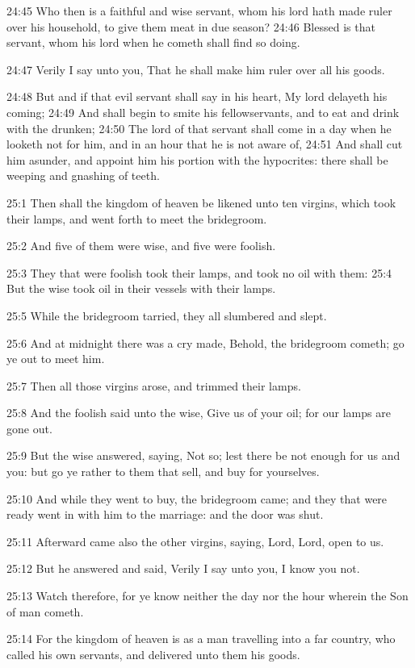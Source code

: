 24:45 Who then is a faithful and wise servant, whom his lord hath made ruler over his household, to give them meat in due season?  24:46 Blessed is that servant, whom his lord when he cometh shall find so doing.

24:47 Verily I say unto you, That he shall make him ruler over all his goods.

24:48 But and if that evil servant shall say in his heart, My lord delayeth his coming; 24:49 And shall begin to smite his fellowservants, and to eat and drink with the drunken; 24:50 The lord of that servant shall come in a day when he looketh not for him, and in an hour that he is not aware of, 24:51 And shall cut him asunder, and appoint him his portion with the hypocrites: there shall be weeping and gnashing of teeth.

25:1 Then shall the kingdom of heaven be likened unto ten virgins, which took their lamps, and went forth to meet the bridegroom.

25:2 And five of them were wise, and five were foolish.

25:3 They that were foolish took their lamps, and took no oil with them: 25:4 But the wise took oil in their vessels with their lamps.

25:5 While the bridegroom tarried, they all slumbered and slept.

25:6 And at midnight there was a cry made, Behold, the bridegroom cometh; go ye out to meet him.

25:7 Then all those virgins arose, and trimmed their lamps.

25:8 And the foolish said unto the wise, Give us of your oil; for our lamps are gone out.

25:9 But the wise answered, saying, Not so; lest there be not enough for us and you: but go ye rather to them that sell, and buy for yourselves.

25:10 And while they went to buy, the bridegroom came; and they that were ready went in with him to the marriage: and the door was shut.

25:11 Afterward came also the other virgins, saying, Lord, Lord, open to us.

25:12 But he answered and said, Verily I say unto you, I know you not.

25:13 Watch therefore, for ye know neither the day nor the hour wherein the Son of man cometh.

25:14 For the kingdom of heaven is as a man travelling into a far country, who called his own servants, and delivered unto them his goods.

